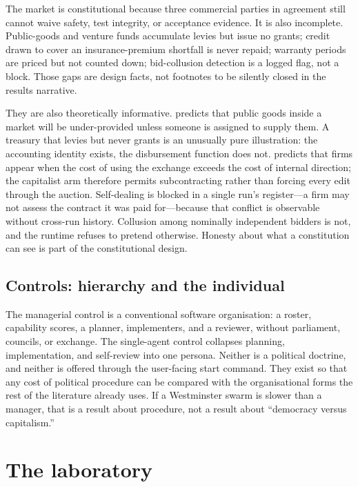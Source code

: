 \documentclass[11pt,a4paper]{article}
\begin{document}
The market is constitutional because three commercial parties in agreement still cannot
waive safety, test integrity, or acceptance evidence. It is also incomplete. Public-goods
and venture funds accumulate levies but issue no grants; credit drawn to cover an
insurance-premium shortfall is never repaid; warranty periods are priced but not counted
down; bid-collusion detection is a logged flag, not a block. Those gaps are design facts,
not footnotes to be silently closed in the results narrative.

They are also theoretically informative. \citet{olson1965} predicts that public goods
inside a market will be under-provided unless someone is assigned to supply them. A
treasury that levies but never grants is an unusually pure illustration: the accounting
identity exists, the disbursement function does not. \citet{coase1937} predicts that
firms appear when the cost of using the exchange exceeds the cost of internal
direction; the capitalist arm therefore permits subcontracting rather than forcing every
edit through the auction. Self-dealing is blocked in a single run's register---a firm
may not assess the contract it was paid for---because that conflict is observable
without cross-run history. Collusion among nominally independent bidders is not, and
the runtime refuses to pretend otherwise. Honesty about what a constitution can see is
part of the constitutional design.

\subsection{Controls: hierarchy and the individual}

The managerial control is a conventional software organisation: a roster, capability
scores, a planner, implementers, and a reviewer, without parliament, councils, or
exchange. The single-agent control collapses planning, implementation, and self-review
into one persona. Neither is a political doctrine, and neither is offered through the
user-facing start command. They exist so that any cost of political procedure can be
compared with the organisational forms the rest of the literature already uses. If a
Westminster swarm is slower than a manager, that is a result about procedure, not a
result about ``democracy versus capitalism.''

\section{The laboratory}
\label{sec:lab}
\end{document}
